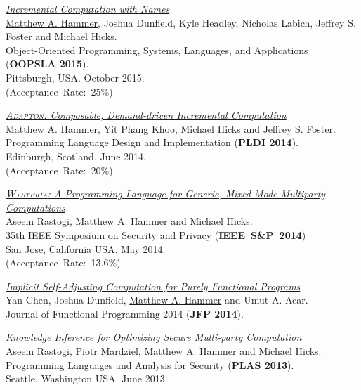 \documentclass[10pt,letterpaper]{article}
\newcommand{\BeanCounter}[1]{(Acceptance~Rate:~#1\%)}
\renewenvironment{itemize}{
  \begin{list}{}{
    \setlength{\leftmargin}{1.5em}
    \setlength{\itemsep}{0.25em}
    \setlength{\parskip}{0pt}
    \setlength{\parsep}{0.25em}
  }
}{
  \end{list}
}
\begin{document}
\begin{itemize}
\item
\href{http://arxiv.org/abs/1503.07792}
{\textit{Incremental Computation with Names}}
\\
\underline{Matthew A. Hammer}, Joshua Dunfield, Kyle Headley, Nicholas Labich,
Jeffrey S. Foster and Michael Hicks.
\\
Object-Oriented Programming, Systems, Languages, and Applications
(\textbf{OOPSLA 2015}).
\\
Pittsburgh, USA. October 2015.
\\
\BeanCounter{25}

\item
\href{http://www.cs.umd.edu/~hammer/adapton}
{\textit{\textsc{Adapton}: Composable, Demand-driven Incremental Computation}}
\\
\underline{Matthew A. Hammer}, Yit Phang Khoo, Michael Hicks and Jeffrey S. Foster.
\\
Programming Language Design and Implementation (\textbf{PLDI 2014}).
\\
Edinburgh, Scotland. June 2014.
\\
\BeanCounter{20}

\item
\href{http://www.cs.umd.edu/~hammer/oakland2014}
{\textit{\textsc{Wysteria}: A Programming Language for Generic, Mixed-Mode Multiparty Computations}}
\\
Aseem Rastogi, \underline{Matthew A. Hammer} and Michael Hicks.
\\
35th IEEE Symposium on Security and Privacy (\textbf{IEEE~S\&P~2014})
\\
San Jose, California USA. May 2014.
\\
\BeanCounter{13.6}

\item
\href{http://www.cs.umd.edu/~hammer/jfp2014}
{\textit{Implicit Self-Adjusting Computation for Purely Functional Programs}}
\\
Yan Chen, Joshua Dunfield, \underline{Matthew A. Hammer} and Umut A. Acar.
\\
Journal of Functional Programming 2014 (\textbf{JFP 2014}).

\item
\href{http://www.cs.umd.edu/~hammer/plas2013}
{\textit{Knowledge Inference for Optimizing Secure Multi-party Computation}}
\\
Aseem Rastogi, Piotr Mardziel, \underline{Matthew A. Hammer} and Michael Hicks.
\\
Programming Languages and Analysis for Security (\textbf{PLAS 2013}).
\\
Seattle, Washington USA. June 2013.


\end{itemize}
\end{document}

